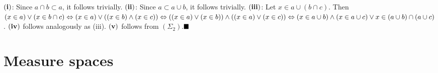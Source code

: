 ${\bf (i)}$: Since $a\cap b\subset a$, it follows trivially. ${\bf (ii)}$: Since $a\subset a\cup b$, it follows trivially. ${\bf (iii)}$: Let $x\in a\cup(b\cap c)$. Then $(x\in a)\lor(x\in b\cap c)\Leftrightarrow (x\in a)\lor((x\in b)\land (x\in c))\Leftrightarrow ((x\in a)\lor(x\in b))\land((x\in a)\lor (x\in c))\Leftrightarrow (x\in a\cup b)\land(x\in a\cup c) \lor x\in (a\cup b)\cap(a\cup c)$. ${\bf (iv)}$ follows analogously as (iii). ${\bf (v)}$ follows from $(\Sigma_2)$.$\qed$\\

\section{Measure spaces}

